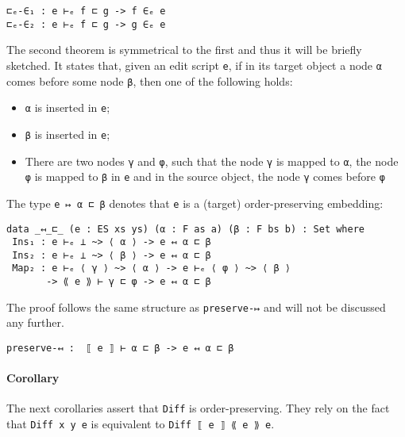 \documentclass[../Thesis.tex]{subfiles}
\begin{document}
\begin{verbatim}
⊏ₑ-∈₁ : e ⊢ₑ f ⊏ g -> f ∈ₑ e
⊏ₑ-∈₂ : e ⊢ₑ f ⊏ g -> g ∈ₑ e
\end{verbatim}

	The second theorem is symmetrical to the first and thus it will be briefly 
	sketched.
	It states that, given an edit script \texttt{e}, if in its
	target object a node \texttt{α} comes before
	some node \texttt{β}, then one of the following holds:
	\begin{itemize}
		\item \texttt{α} is inserted in \texttt{e};
		\item \texttt{β} is inserted in \texttt{e};
		\item There are two nodes \texttt{γ} and \texttt{φ}, such that the node 
		\texttt{γ} is mapped to \texttt{α}, the node \texttt{φ} is mapped to 
		\texttt{β} in 	\texttt{e} and in the source object, 
		the node \texttt{γ} comes before \texttt{φ}
	\end{itemize}

	The type \texttt{e ↦ α ⊏ β} denotes that \texttt{e} is a (target) 
	order-preserving embedding:

\begin{verbatim}
data _↤_⊏_ (e : ES xs ys) (α : F as a) (β : F bs b) : Set where
 Ins₁ : e ⊢ₑ ⊥ ~> ⟨ α ⟩ -> e ↤ α ⊏ β
 Ins₂ : e ⊢ₑ ⊥ ~> ⟨ β ⟩ -> e ↤ α ⊏ β
 Map₂ : e ⊢ₑ ⟨ γ ⟩ ~> ⟨ α ⟩ -> e ⊢ₑ ⟨ φ ⟩ ~> ⟨ β ⟩ 
       -> ⟪ e ⟫ ⊢ γ ⊏ φ -> e ↤ α ⊏ β
\end{verbatim}
         
	The proof follows the same structure as \texttt{preserve-↦} 
	and will not be discussed any further.
\begin{verbatim}
preserve-↤ :  ⟦ e ⟧ ⊢ α ⊏ β -> e ↤ α ⊏ β 
\end{verbatim}
	
	\paragraph{Corollary}
	The next corollaries assert that \texttt{Diff} is order-preserving.
 	They rely on the fact that \texttt{Diff x y e} is equivalent to
	\texttt{Diff ⟦ e ⟧ ⟪ e ⟫ e}.
\end{document}

